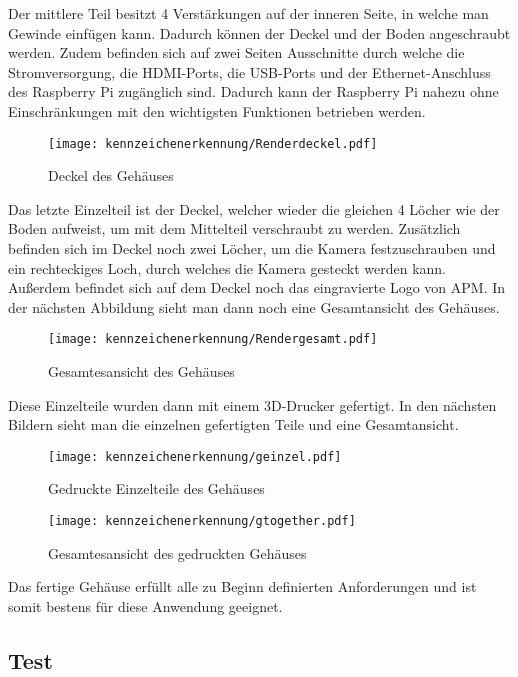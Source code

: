 Der mittlere Teil besitzt 4 Verstärkungen auf der inneren Seite, in welche man Gewinde einfügen kann. Dadurch können der Deckel und der Boden angeschraubt werden. 
Zudem befinden sich auf zwei Seiten Ausschnitte durch welche die Stromversorgung, die HDMI-Ports, die USB-Ports und der Ethernet-Anschluss des Raspberry Pi 
zugänglich sind. Dadurch kann der Raspberry Pi nahezu ohne Einschränkungen mit den wichtigsten Funktionen betrieben werden.

\begin{figure}[H]
    \centering
    \texttt{[image: kennzeichenerkennung/Renderdeckel.pdf]}
    \caption{Deckel des Gehäuses}
\end{figure}

Das letzte Einzelteil ist der Deckel, welcher wieder die gleichen 4 Löcher wie der Boden aufweist, um mit dem Mittelteil verschraubt zu werden. 
Zusätzlich befinden sich im Deckel noch zwei Löcher, um die Kamera festzuschrauben und ein rechteckiges Loch, durch welches die Kamera gesteckt werden kann. 
Außerdem befindet sich auf dem Deckel noch das eingravierte Logo von APM. In der nächsten Abbildung sieht man dann noch eine Gesamtansicht des Gehäuses.

\begin{figure}[H]
    \centering
    \texttt{[image: kennzeichenerkennung/Rendergesamt.pdf]}
    \caption{Gesamtesansicht des Gehäuses}
\end{figure}

Diese Einzelteile wurden dann mit einem 3D-Drucker gefertigt. In den nächsten Bildern sieht man die einzelnen gefertigten Teile und eine Gesamtansicht.

\begin{figure}[H]
    \centering
    \texttt{[image: kennzeichenerkennung/geinzel.pdf]}
    \caption{Gedruckte Einzelteile des Gehäuses}
\end{figure}

\begin{figure}[H]
    \centering
    \texttt{[image: kennzeichenerkennung/gtogether.pdf]}
    \caption{Gesamtesansicht des gedruckten Gehäuses}
\end{figure}

Das fertige Gehäuse erfüllt alle zu Beginn definierten Anforderungen und ist somit bestens für diese Anwendung geeignet.

\subsection{Test}

